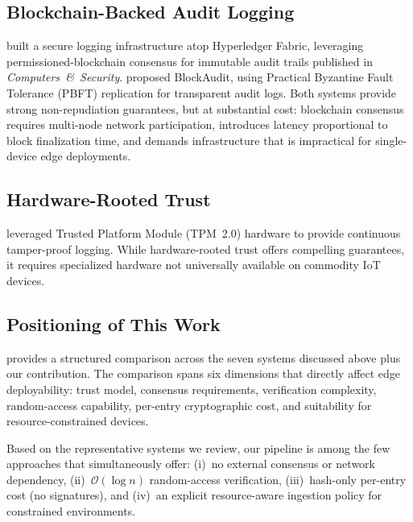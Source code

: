 \documentclass[preprint,12pt]{elsarticle}
\begin{document}
\subsection{Blockchain-Backed Audit Logging}

\citet{putz2019secure} built a secure logging infrastructure atop Hyperledger Fabric, leveraging permissioned-blockchain consensus for immutable audit trails published in \textit{Computers~\&~Security}.
\citet{ahmad2019blockaudit} proposed BlockAudit, using Practical Byzantine Fault Tolerance (PBFT) replication for transparent audit logs.
Both systems provide strong non-repudiation guarantees, but at substantial cost: blockchain consensus requires multi-node network participation, introduces latency proportional to block finalization time, and demands infrastructure that is impractical for single-device edge deployments.

\subsection{Hardware-Rooted Trust}

\citet{sinha2014continuous} leveraged Trusted Platform Module (TPM~2.0) hardware to provide continuous tamper-proof logging.
While hardware-rooted trust offers compelling guarantees, it requires specialized hardware not universally available on commodity IoT devices.

\subsection{Positioning of This Work}

 provides a structured comparison across the seven systems discussed above plus our contribution.
The comparison spans six dimensions that directly affect edge deployability: trust model, consensus requirements, verification complexity, random-access capability, per-entry cryptographic cost, and suitability for resource-constrained devices.

Based on the representative systems we review, our pipeline is among the few approaches that simultaneously offer: (i)~no external consensus or network dependency, (ii)~$\mathcal{O}(\log n)$ random-access verification, (iii)~hash-only per-entry cost (no signatures), and (iv)~an explicit resource-aware ingestion policy for constrained environments.
\end{document}
